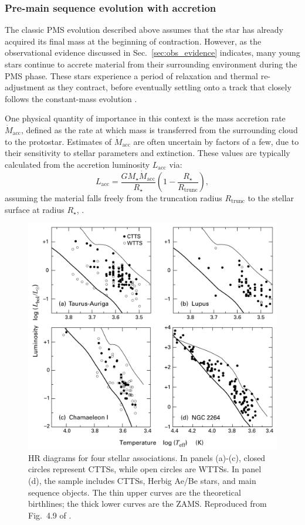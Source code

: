 \documentclass[12pt,a4paper]{article}
\newcommand{\mr}{\mathrm}
\begin{document}
\subsubsection{Pre-main sequence evolution with accretion}
\label{sec:pms_accretion}

The classic PMS evolution described above assumes that the star has already acquired its final mass at the beginning of contraction. However, as the observational evidence discussed in Sec.~\ref{sec:obs_evidence} indicates, many young stars continue to accrete material from their surrounding environment during the PMS phase. These stars experience a period of relaxation and thermal re-adjustment as they contract, before eventually settling onto a track that closely follows the constant-mass evolution \parencite{KippenhahnEtAl2013}.

One physical quantity of importance in this context is the mass accretion rate $\dot{M}_\mr{acc}$, defined as the rate at which mass is transferred from the surrounding cloud to the protostar. Estimates of $\dot{M}_\mr{acc}$ are often uncertain by factors of a few, due to their sensitivity to stellar parameters and extinction. These values are typically calculated from the accretion luminosity $L_\mr{acc}$ via:
\begin{equation}
  L_\mr{acc} = \frac{GM_\star \dot{M}_\mr{acc}}{R_\star}\left(1 - \frac{R_\star}{R_\mr{trunc}}\right),
\end{equation}
assuming the material falls freely from the truncation radius $R_\mr{trunc}$ to the stellar surface at radius $R_\star$, \parencite[see review by][]{HartmannEtAl2016}. 

\begin{figure}[htbp]
  \centering
  \includegraphics[width=.85\textwidth]{StahlerPalla2004_fig4p9.png}
  \caption{HR diagrams for four stellar associations. In panels (a)-(c), closed circles represent CTTSs, while open circles are WTTSs. In panel (d), the sample includes CTTSs, Herbig Ae/Be stars, and main sequence objects. The thin upper curves are the theoretical birthlines; the thick lower curves are the ZAMS. Reproduced from Fig.~4.9 of \textcite{StahlerPalla2004}.} \label{fig:obs_birthline} 
\end{figure}
\end{document}
